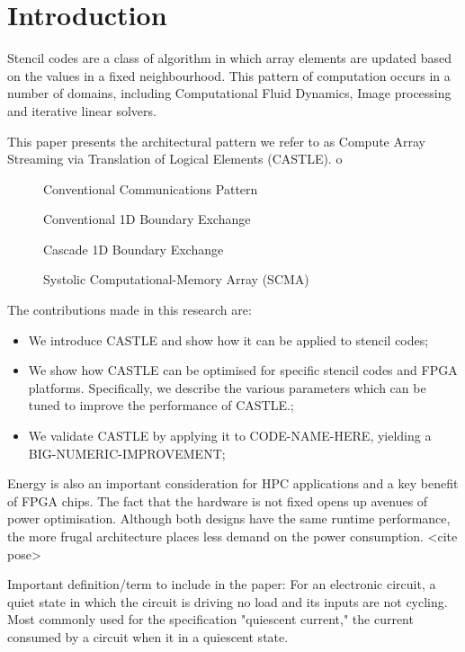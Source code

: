 \section{Introduction}
Stencil codes are a class of algorithm in which array elements are updated based on the values in a fixed neighbourhood.
This pattern of computation occurs in a number of domains, including Computational Fluid Dynamics, Image processing and iterative linear solvers.

This paper presents the architectural pattern we refer to as Compute Array Streaming via Translation of Logical Elements (CASTLE).
o

\begin{figure}
  \centering
  
  \caption{Conventional Communications Pattern}
  \label{fig:convcomms}
\end{figure}

\begin{figure}
  \centering
  
  \caption{Conventional 1D Boundary Exchange}
  \label{fig:exch1dold}
\end{figure}


\begin{figure}
  \centering
  
  \caption{Cascade 1D Boundary Exchange}
  \label{fig:trans1d}
\end{figure}

\begin{figure}
  \centering
  
  \caption{Systolic Computational-Memory Array (SCMA)}
  \label{fig:scma}
\end{figure}

The contributions made in this research are:
\begin{itemize}
  \item{We introduce CASTLE and show how it can be applied to stencil codes;}
  \item{We show how CASTLE can be optimised for specific stencil codes and FPGA platforms.
        Specifically, we describe the various parameters which can be tuned to improve the performance of CASTLE.;}
  \item{We validate CASTLE by applying it to CODE-NAME-HERE, yielding a BIG-NUMERIC-IMPROVEMENT;}
\end{itemize}


Energy is also an important consideration for HPC applications and a key benefit of FPGA chips.
The fact that the hardware is not fixed opens up avenues of power optimisation.
Although both designs have the same runtime performance, the more frugal architecture places less demand on the power consumption.
<cite pose>


Important definition/term to include in the paper:
For an electronic circuit, a quiet state in which the circuit is driving no load and its inputs are not cycling. Most commonly used for the specification "quiescent current," the current consumed by a circuit when it in a quiescent state.

